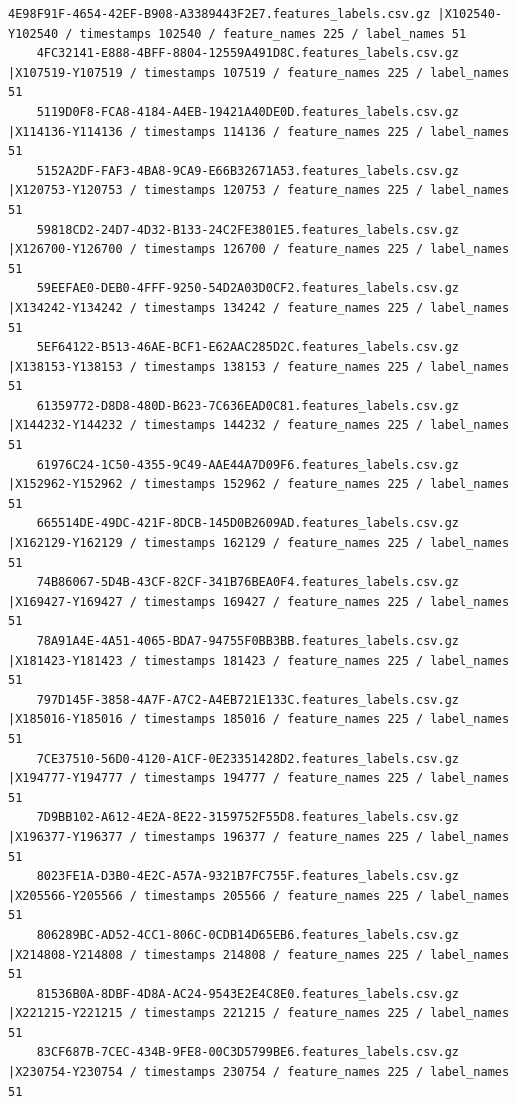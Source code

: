 \documentclass{UoNMCHA}
\numberwithin{equation}{section}
\begin{document}
\begin{lstlisting}[breaklines=true]
    4E98F91F-4654-42EF-B908-A3389443F2E7.features_labels.csv.gz |X102540-Y102540 / timestamps 102540 / feature_names 225 / label_names 51
    4FC32141-E888-4BFF-8804-12559A491D8C.features_labels.csv.gz |X107519-Y107519 / timestamps 107519 / feature_names 225 / label_names 51
    5119D0F8-FCA8-4184-A4EB-19421A40DE0D.features_labels.csv.gz |X114136-Y114136 / timestamps 114136 / feature_names 225 / label_names 51
    5152A2DF-FAF3-4BA8-9CA9-E66B32671A53.features_labels.csv.gz |X120753-Y120753 / timestamps 120753 / feature_names 225 / label_names 51
    59818CD2-24D7-4D32-B133-24C2FE3801E5.features_labels.csv.gz |X126700-Y126700 / timestamps 126700 / feature_names 225 / label_names 51
    59EEFAE0-DEB0-4FFF-9250-54D2A03D0CF2.features_labels.csv.gz |X134242-Y134242 / timestamps 134242 / feature_names 225 / label_names 51
    5EF64122-B513-46AE-BCF1-E62AAC285D2C.features_labels.csv.gz |X138153-Y138153 / timestamps 138153 / feature_names 225 / label_names 51
    61359772-D8D8-480D-B623-7C636EAD0C81.features_labels.csv.gz |X144232-Y144232 / timestamps 144232 / feature_names 225 / label_names 51
    61976C24-1C50-4355-9C49-AAE44A7D09F6.features_labels.csv.gz |X152962-Y152962 / timestamps 152962 / feature_names 225 / label_names 51
    665514DE-49DC-421F-8DCB-145D0B2609AD.features_labels.csv.gz |X162129-Y162129 / timestamps 162129 / feature_names 225 / label_names 51
    74B86067-5D4B-43CF-82CF-341B76BEA0F4.features_labels.csv.gz |X169427-Y169427 / timestamps 169427 / feature_names 225 / label_names 51
    78A91A4E-4A51-4065-BDA7-94755F0BB3BB.features_labels.csv.gz |X181423-Y181423 / timestamps 181423 / feature_names 225 / label_names 51
    797D145F-3858-4A7F-A7C2-A4EB721E133C.features_labels.csv.gz |X185016-Y185016 / timestamps 185016 / feature_names 225 / label_names 51
    7CE37510-56D0-4120-A1CF-0E23351428D2.features_labels.csv.gz |X194777-Y194777 / timestamps 194777 / feature_names 225 / label_names 51
    7D9BB102-A612-4E2A-8E22-3159752F55D8.features_labels.csv.gz |X196377-Y196377 / timestamps 196377 / feature_names 225 / label_names 51
    8023FE1A-D3B0-4E2C-A57A-9321B7FC755F.features_labels.csv.gz |X205566-Y205566 / timestamps 205566 / feature_names 225 / label_names 51
    806289BC-AD52-4CC1-806C-0CDB14D65EB6.features_labels.csv.gz |X214808-Y214808 / timestamps 214808 / feature_names 225 / label_names 51
    81536B0A-8DBF-4D8A-AC24-9543E2E4C8E0.features_labels.csv.gz |X221215-Y221215 / timestamps 221215 / feature_names 225 / label_names 51
    83CF687B-7CEC-434B-9FE8-00C3D5799BE6.features_labels.csv.gz |X230754-Y230754 / timestamps 230754 / feature_names 225 / label_names 51

\end{lstlisting}
\end{document}
